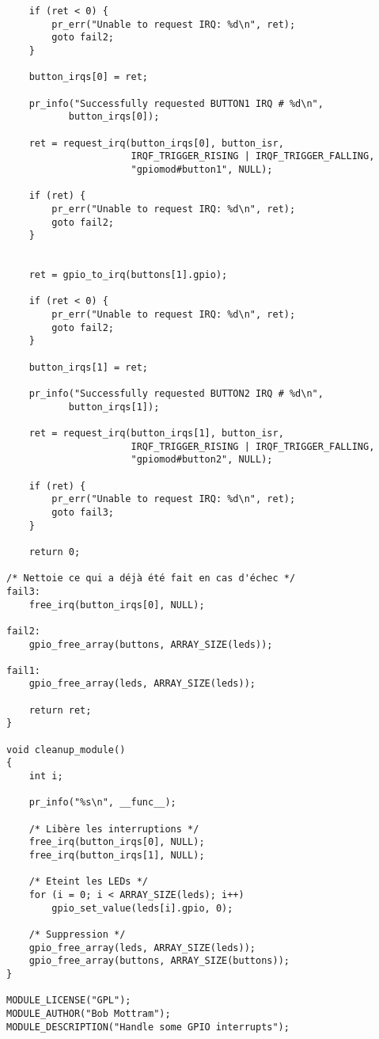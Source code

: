 \documentclass[11pt]{article}
\begin{document}
\begin{verbatim}
    if (ret < 0) {
        pr_err("Unable to request IRQ: %d\n", ret);
        goto fail2;
    }

    button_irqs[0] = ret;

    pr_info("Successfully requested BUTTON1 IRQ # %d\n",
           button_irqs[0]);

    ret = request_irq(button_irqs[0], button_isr,
                      IRQF_TRIGGER_RISING | IRQF_TRIGGER_FALLING,
                      "gpiomod#button1", NULL);

    if (ret) {
        pr_err("Unable to request IRQ: %d\n", ret);
        goto fail2;
    }


    ret = gpio_to_irq(buttons[1].gpio);

    if (ret < 0) {
        pr_err("Unable to request IRQ: %d\n", ret);
        goto fail2;
    }

    button_irqs[1] = ret;

    pr_info("Successfully requested BUTTON2 IRQ # %d\n",
           button_irqs[1]);

    ret = request_irq(button_irqs[1], button_isr,
                      IRQF_TRIGGER_RISING | IRQF_TRIGGER_FALLING,
                      "gpiomod#button2", NULL);

    if (ret) {
        pr_err("Unable to request IRQ: %d\n", ret);
        goto fail3;
    }

    return 0;

/* Nettoie ce qui a déjà été fait en cas d'échec */
fail3:
    free_irq(button_irqs[0], NULL);

fail2:
    gpio_free_array(buttons, ARRAY_SIZE(leds));

fail1:
    gpio_free_array(leds, ARRAY_SIZE(leds));

    return ret;
}

void cleanup_module()
{
    int i;

    pr_info("%s\n", __func__);

    /* Libère les interruptions */
    free_irq(button_irqs[0], NULL);
    free_irq(button_irqs[1], NULL);

    /* Eteint les LEDs */
    for (i = 0; i < ARRAY_SIZE(leds); i++)
        gpio_set_value(leds[i].gpio, 0);

    /* Suppression */
    gpio_free_array(leds, ARRAY_SIZE(leds));
    gpio_free_array(buttons, ARRAY_SIZE(buttons));
}

MODULE_LICENSE("GPL");
MODULE_AUTHOR("Bob Mottram");
MODULE_DESCRIPTION("Handle some GPIO interrupts");
\end{verbatim}
\end{document}
